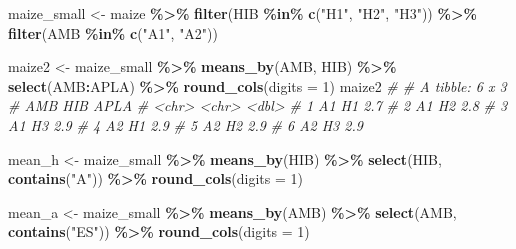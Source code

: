 \documentclass[
]{book}
\newenvironment{Shaded}{\begin{snugshade}}{\end{snugshade}}
\newcommand{\CommentTok}[1]{\textcolor[rgb]{0.56,0.35,0.01}{\textit{#1}}}
\newcommand{\DataTypeTok}[1]{\textcolor[rgb]{0.13,0.29,0.53}{#1}}
\newcommand{\DecValTok}[1]{\textcolor[rgb]{0.00,0.00,0.81}{#1}}
\newcommand{\KeywordTok}[1]{\textcolor[rgb]{0.13,0.29,0.53}{\textbf{#1}}}
\newcommand{\NormalTok}[1]{#1}
\newcommand{\OperatorTok}[1]{\textcolor[rgb]{0.81,0.36,0.00}{\textbf{#1}}}
\newcommand{\StringTok}[1]{\textcolor[rgb]{0.31,0.60,0.02}{#1}}
\numberwithin{equation}{section}
\begin{document}
\begin{Shaded}
\begin{Highlighting}[]
\NormalTok{maize\_small \textless{}{-}}\StringTok{ }
\StringTok{  }\NormalTok{maize }\OperatorTok{\%\textgreater{}\%}
\StringTok{  }\KeywordTok{filter}\NormalTok{(HIB }\OperatorTok{\%in\%}\StringTok{ }\KeywordTok{c}\NormalTok{(}\StringTok{"H1"}\NormalTok{, }\StringTok{"H2"}\NormalTok{, }\StringTok{"H3"}\NormalTok{)) }\OperatorTok{\%\textgreater{}\%}
\StringTok{  }\KeywordTok{filter}\NormalTok{(AMB }\OperatorTok{\%in\%}\StringTok{ }\KeywordTok{c}\NormalTok{(}\StringTok{"A1"}\NormalTok{, }\StringTok{"A2"}\NormalTok{))}

\NormalTok{maize2 \textless{}{-}}\StringTok{ }
\StringTok{  }\NormalTok{maize\_small }\OperatorTok{\%\textgreater{}\%}\StringTok{ }
\StringTok{  }\KeywordTok{means\_by}\NormalTok{(AMB, HIB) }\OperatorTok{\%\textgreater{}\%}\StringTok{ }
\StringTok{  }\KeywordTok{select}\NormalTok{(AMB}\OperatorTok{:}\NormalTok{APLA) }\OperatorTok{\%\textgreater{}\%}\StringTok{ }
\StringTok{  }\KeywordTok{round\_cols}\NormalTok{(}\DataTypeTok{digits =} \DecValTok{1}\NormalTok{)}
\NormalTok{maize2}
\CommentTok{\# \# A tibble: 6 x 3}
\CommentTok{\#   AMB   HIB    APLA}
\CommentTok{\#   \textless{}chr\textgreater{} \textless{}chr\textgreater{} \textless{}dbl\textgreater{}}
\CommentTok{\# 1 A1    H1      2.7}
\CommentTok{\# 2 A1    H2      2.8}
\CommentTok{\# 3 A1    H3      2.9}
\CommentTok{\# 4 A2    H1      2.9}
\CommentTok{\# 5 A2    H2      2.9}
\CommentTok{\# 6 A2    H3      2.9}

\NormalTok{mean\_h \textless{}{-}}\StringTok{ }
\StringTok{  }\NormalTok{maize\_small }\OperatorTok{\%\textgreater{}\%}
\StringTok{  }\KeywordTok{means\_by}\NormalTok{(HIB) }\OperatorTok{\%\textgreater{}\%}\StringTok{ }
\StringTok{  }\KeywordTok{select}\NormalTok{(HIB, }\KeywordTok{contains}\NormalTok{(}\StringTok{"A"}\NormalTok{)) }\OperatorTok{\%\textgreater{}\%}\StringTok{ }
\StringTok{  }\KeywordTok{round\_cols}\NormalTok{(}\DataTypeTok{digits =} \DecValTok{1}\NormalTok{)}
  
\NormalTok{mean\_a \textless{}{-}}
\StringTok{  }\NormalTok{maize\_small }\OperatorTok{\%\textgreater{}\%}
\StringTok{  }\KeywordTok{means\_by}\NormalTok{(AMB) }\OperatorTok{\%\textgreater{}\%}\StringTok{ }
\StringTok{  }\KeywordTok{select}\NormalTok{(AMB, }\KeywordTok{contains}\NormalTok{(}\StringTok{"ES"}\NormalTok{)) }\OperatorTok{\%\textgreater{}\%}\StringTok{ }
\StringTok{  }\KeywordTok{round\_cols}\NormalTok{(}\DataTypeTok{digits =} \DecValTok{1}\NormalTok{)}
\end{Highlighting}
\end{Shaded}
\end{document}
